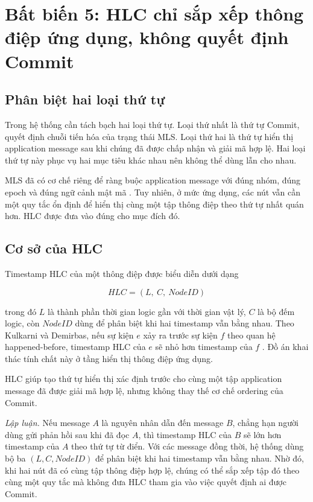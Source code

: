 \documentclass[../DoAn.tex]{subfiles}
\begin{document}
\section{Bất biến 5: HLC chỉ sắp xếp thông điệp ứng dụng, không quyết định Commit}
\label{sec:bat_bien_hlc}

\subsection{Phân biệt hai loại thứ tự}

Trong hệ thống cần tách bạch hai loại thứ tự. Loại thứ nhất là thứ tự Commit, quyết định chuỗi tiến hóa của trạng thái MLS. Loại thứ hai là thứ tự hiển thị application message sau khi chúng đã được chấp nhận và giải mã hợp lệ. Hai loại thứ tự này phục vụ hai mục tiêu khác nhau nên không thể dùng lẫn cho nhau.

MLS đã có cơ chế riêng để ràng buộc application message với đúng nhóm, đúng epoch và đúng ngữ cảnh mật mã \cite{rfc9420}. Tuy nhiên, ở mức ứng dụng, các nút vẫn cần một quy tắc ổn định để hiển thị cùng một tập thông điệp theo thứ tự nhất quán hơn. HLC được đưa vào đúng cho mục đích đó.

\subsection{Cơ sở của HLC}

Timestamp HLC của một thông điệp được biểu diễn dưới dạng

\begin{equation}
	\label{eq:hlc_analysis}
	HLC = (L,\ C,\ NodeID)
\end{equation}

trong đó $L$ là thành phần thời gian logic gần với thời gian vật lý, $C$ là bộ đếm logic, còn $NodeID$ dùng để phân biệt khi hai timestamp vẫn bằng nhau. Theo Kulkarni và Demirbas, nếu sự kiện $e$ xảy ra trước sự kiện $f$ theo quan hệ happened-before, timestamp HLC của $e$ sẽ nhỏ hơn timestamp của $f$ \cite{kulkarni2014hlc}. Đồ án khai thác tính chất này ở tầng hiển thị thông điệp ứng dụng.

\begin{proposition}
\label{prop:hlc_ordering}
HLC giúp tạo thứ tự hiển thị xác định trước cho cùng một tập application message đã được giải mã hợp lệ, nhưng không thay thế cơ chế ordering của Commit.
\end{proposition}

\textit{Lập luận.} Nếu message $A$ là nguyên nhân dẫn đến message $B$, chẳng hạn người dùng gửi phản hồi sau khi đã đọc $A$, thì timestamp HLC của $B$ sẽ lớn hơn timestamp của $A$ theo thứ tự từ điển. Với các message đồng thời, hệ thống dùng bộ ba $(L, C, NodeID)$ để phân biệt khi hai timestamp vẫn bằng nhau. Nhờ đó, khi hai nút đã có cùng tập thông điệp hợp lệ, chúng có thể sắp xếp tập đó theo cùng một quy tắc mà không đưa HLC tham gia vào việc quyết định ai được Commit.
\end{document}
